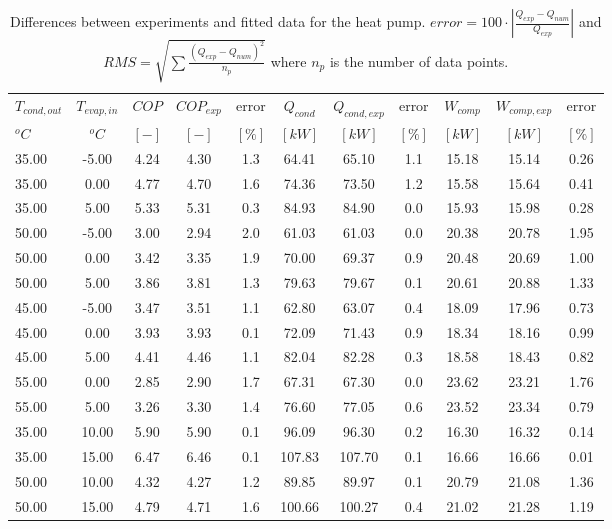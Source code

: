 \documentclass[english]{SPFShortReport}
\begin{document}
\begin{table}[!ht]
\begin{small}
\caption{Differences between experiments and fitted data for the heat pump.          $error=100 \cdot |\frac{Q_{exp}-Q_{num}}{Q_{exp}}|$ and $RMS = \sqrt { \sum{\frac{(Q_{exp}-Q_{num})^2}{n_p}} }$ where $n_p$ is the number of data points.}
\begin{center}
\resizebox{12cm}{!} 
{
\begin{tabular}{l | c c c c c c c c c c } 
\hline
\hline
$T_{cond,out}$ &$T_{evap,in}$ &$COP$ &$COP_{exp}$ &error &$Q_{cond}$ &$Q_{cond,exp}$ &error &$W_{comp}$ &$W_{comp,exp}$ &error \\ 
$^oC$ &$^oC$ &$[-]$ &$[-]$ &$[\%]$ &$[kW]$ &$[kW]$ &$[\%]$ &$[kW]$ &$[kW]$ &$[\%]$\\ 
\hline
35.00  & -5.00 & 4.24 & 4.30 & 1.3 & 64.41 & 65.10 & 1.1 & 15.18 & 15.14 & 0.26\\ 
35.00  & 0.00 & 4.77 & 4.70 & 1.6 & 74.36 & 73.50 & 1.2 & 15.58 & 15.64 & 0.41\\ 
35.00  & 5.00 & 5.33 & 5.31 & 0.3 & 84.93 & 84.90 & 0.0 & 15.93 & 15.98 & 0.28\\ 
50.00  & -5.00 & 3.00 & 2.94 & 2.0 & 61.03 & 61.03 & 0.0 & 20.38 & 20.78 & 1.95\\ 
50.00  & 0.00 & 3.42 & 3.35 & 1.9 & 70.00 & 69.37 & 0.9 & 20.48 & 20.69 & 1.00\\ 
50.00  & 5.00 & 3.86 & 3.81 & 1.3 & 79.63 & 79.67 & 0.1 & 20.61 & 20.88 & 1.33\\ 
45.00  & -5.00 & 3.47 & 3.51 & 1.1 & 62.80 & 63.07 & 0.4 & 18.09 & 17.96 & 0.73\\ 
45.00  & 0.00 & 3.93 & 3.93 & 0.1 & 72.09 & 71.43 & 0.9 & 18.34 & 18.16 & 0.99\\ 
45.00  & 5.00 & 4.41 & 4.46 & 1.1 & 82.04 & 82.28 & 0.3 & 18.58 & 18.43 & 0.82\\ 
55.00  & 0.00 & 2.85 & 2.90 & 1.7 & 67.31 & 67.30 & 0.0 & 23.62 & 23.21 & 1.76\\ 
55.00  & 5.00 & 3.26 & 3.30 & 1.4 & 76.60 & 77.05 & 0.6 & 23.52 & 23.34 & 0.79\\ 
35.00  & 10.00 & 5.90 & 5.90 & 0.1 & 96.09 & 96.30 & 0.2 & 16.30 & 16.32 & 0.14\\ 
35.00  & 15.00 & 6.47 & 6.46 & 0.1 & 107.83 & 107.70 & 0.1 & 16.66 & 16.66 & 0.01\\ 
50.00  & 10.00 & 4.32 & 4.27 & 1.2 & 89.85 & 89.97 & 0.1 & 20.79 & 21.08 & 1.36\\ 
50.00  & 15.00 & 4.79 & 4.71 & 1.6 & 100.66 & 100.27 & 0.4 & 21.02 & 21.28 & 1.19\\ 

\end{tabular}}
\end{center}
\end{small}
\end{table}
\end{document}
